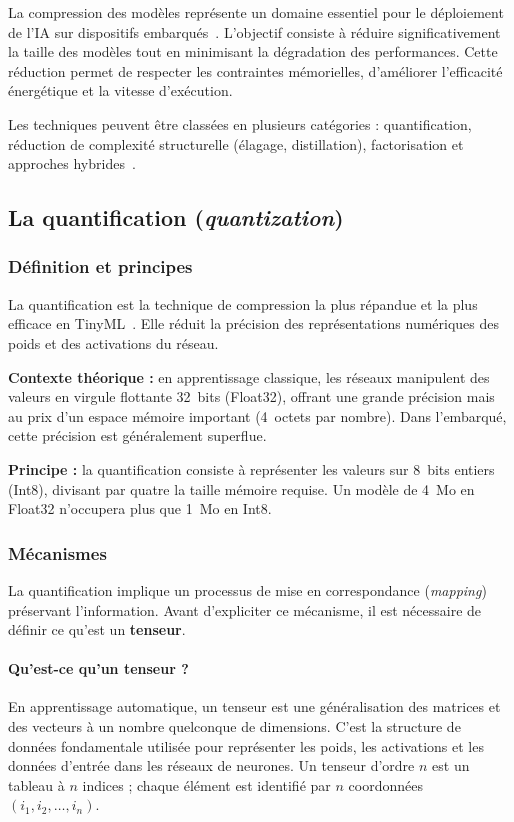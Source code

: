 La compression des modèles représente un domaine essentiel pour le déploiement
de l'IA sur dispositifs embarqués~\cite{sze2020efficient}. L'objectif consiste
à réduire significativement la taille des modèles tout en minimisant la
dégradation des performances. Cette réduction permet de respecter les
contraintes mémorielles, d'améliorer l'efficacité énergétique et la vitesse
d'exécution.

Les techniques peuvent être classées en plusieurs catégories : quantification,
réduction de complexité structurelle (élagage, distillation), factorisation et
approches hybrides~\cite{han2016deep}.

\subsection{La quantification (\emph{quantization})}

\subsubsection{Définition et principes}

La quantification est la technique de compression la plus répandue et la plus
efficace en TinyML~\cite{jacob2018quantization,gholami2021survey}. Elle réduit
la précision des représentations numériques des poids et des activations du
réseau.

\textbf{Contexte théorique :} en apprentissage classique, les réseaux
manipulent des valeurs en virgule flottante 32~bits (Float32), offrant une
grande précision mais au prix d'un espace mémoire important (4~octets par
nombre). Dans l'embarqué, cette précision est généralement superflue.

\textbf{Principe :} la quantification consiste à représenter les valeurs sur
8~bits entiers (Int8), divisant par quatre la taille mémoire requise. Un modèle
de 4~Mo en Float32 n'occupera plus que 1~Mo en Int8.

\subsubsection{Mécanismes}

La quantification implique un processus de mise en correspondance
(\emph{mapping}) préservant l'information. Avant d'expliciter ce mécanisme, il
est nécessaire de définir ce qu'est un \textbf{tenseur}.

\paragraph{Qu'est-ce qu'un tenseur ?} En apprentissage automatique, un tenseur
est une généralisation des matrices et des vecteurs à un nombre quelconque de
dimensions. C'est la structure de données fondamentale utilisée pour
représenter les poids, les activations et les données d'entrée dans les réseaux
de neurones. Un tenseur d'ordre $n$ est un tableau à $n$ indices ; chaque
élément est identifié par $n$ coordonnées $(i_1, i_2, \ldots, i_n)$.

